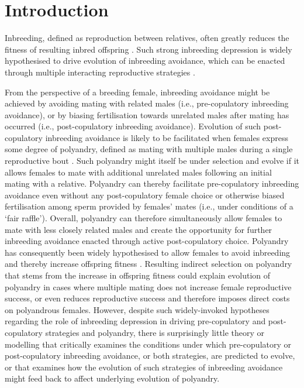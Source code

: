 \documentclass[10pt,letterpaper]{article}
\begin{document}
\section*{Introduction}

Inbreeding, defined as reproduction between relatives, often greatly reduces the fitness of resulting inbred offspring \cite[termed `inbreeding depression';][]{Charlesworth1999, Keller2002, Charlesworth2009}. Such strong inbreeding depression is widely hypothesised to drive evolution of inbreeding avoidance, which can be enacted through multiple interacting reproductive strategies \cite[][]{Parker1979, Parker2006, Pusey1996, Szulkin2012}. 

From the perspective of a breeding female, inbreeding avoidance might be achieved by avoiding mating with related males (i.e., pre-copulatory inbreeding avoidance), or by biasing fertilisation towards unrelated males after mating has occurred (i.e., post-copulatory inbreeding avoidance). Evolution of such post-copulatory inbreeding avoidance is likely to be facilitated when females express some degree of polyandry, defined as mating with multiple males during a single reproductive bout \cite[but see][]{Dougherty2016}. Such polyandry might itself be under selection and evolve if it allows females to mate with additional unrelated males following an initial mating with a relative. Polyandry can thereby facilitate pre-copulatory inbreeding avoidance even without any post-copulatory female choice or otherwise biased fertilisation among sperm provided by females' mates (i.e., under conditions of a `fair raffle'). Overall, polyandry can therefore simultaneously allow females to mate with less closely related males and create the opportunity for further inbreeding avoidance enacted through active post-copulatory choice. Polyandry has consequently been widely hypothesised to allow females to avoid inbreeding and thereby increase offspring fitness \cite[][]{Zeh1997, Jennions2000, Tregenza2002}. Resulting indirect selection on polyandry that stems from the increase in offspring fitness could explain evolution of polyandry in cases where multiple mating does not increase female reproductive success, or even reduces reproductive success and therefore imposes direct costs on polyandrous females. However, despite such widely-invoked hypotheses regarding the role of inbreeding depression in driving pre-copulatory and post-copulatory strategies and polyandry, there is surprisingly little theory or modelling that critically examines the conditions under which pre-copulatory or post-copulatory inbreeding avoidance, or both strategies, are predicted to evolve, or that examines how the evolution of such strategies of inbreeding avoidance might feed back to affect underlying evolution of polyandry.
\end{document}
